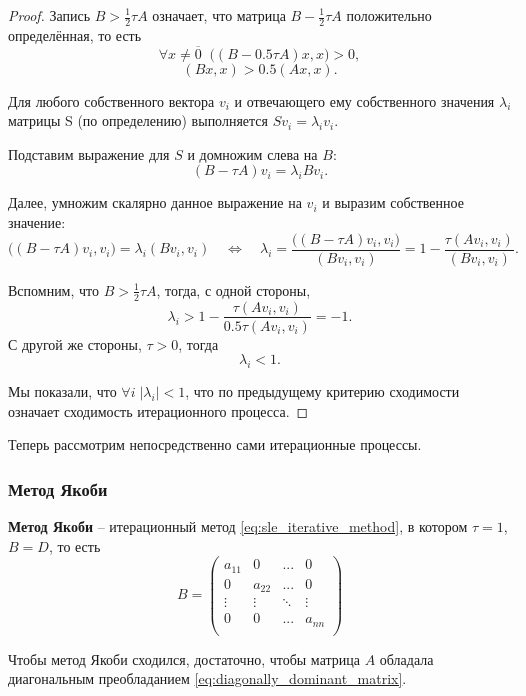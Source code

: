 \documentclass{article}
\begin{document}
\begin{proof}
	Запись $B>\frac{1}{2}\tau A$ означает, что матрица $B-\frac{1}{2}\tau A$
	положительно определённая, то есть
	\[\forall x\ne\overline{0}\;\; \big((B-0.5\tau A)x,x\big)>0,\]
	\[(Bx,x)>0.5(Ax,x).\]

	Для любого собственного вектора $v_i$ и отвечающего ему собственного
	значения $\lambda_i$ матрицы S (по определению) выполняется
	$Sv_i=\lambda_iv_i$.

	Подставим выражение для $S$ и домножим слева на $B$:
	\[(B-\tau A)v_i=\lambda_iBv_i.\]

	Далее, умножим скалярно данное выражение на $v_i$ и выразим собственное
	значение:
	\[\big((B-\tau A)v_i, v_i\big)=\lambda_i(Bv_i,v_i)\quad\Leftrightarrow
	\quad\lambda_i=\frac{\big((B-\tau A)v_i, v_i\big)}{(Bv_i,v_i)}=
	1-\frac{\tau(Av_i, v_i)}{(Bv_i,v_i)}.\]

	Вспомним, что $B>\frac{1}{2}\tau A$, тогда, с одной стороны,
	\[\lambda_i>1-\frac{\tau(Av_i, v_i)}{0.5\tau(Av_i, v_i)}=-1.\]
	С другой же стороны, $\tau>0$, тогда
	\[\lambda_i<1.\]

	Мы показали, что $\forall i\; |\lambda_i|<1$, что по предыдущему
	критерию сходимости означает сходимость итерационного процесса.
\end{proof}

Теперь рассмотрим непосредственно сами итерационные процессы.
\subsubsection{Метод Якоби}
\begin{define}
	\textbf{Метод Якоби} -- итерационный метод
	\eqref{eq:sle_iterative_method}, в котором $\tau=1$, $B=D$, то есть
	\[B=
		\begin{pmatrix}
			a_{11}	& 0	& ...	& 0 \\
			0	& a_{22}& ...	& 0 \\
			\vdots	& \vdots&\ddots &\vdots \\
			0	& 0	& ...	& a_{nn} \\
		\end{pmatrix}
	\]
\end{define}

\begin{theorem}
	Чтобы метод Якоби сходился, достаточно, чтобы матрица $A$
	обладала диагональным преобладанием
	\eqref{eq:diagonally_dominant_matrix}.
\end{theorem}
\end{document}
